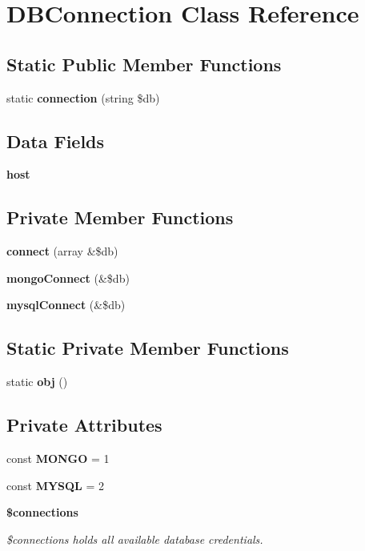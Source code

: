 \section{D\+B\+Connection Class Reference}
\label{class_d_b_connection}
\subsection*{Static Public Member Functions}
\begin{DoxyCompactItemize}
\item 
static \textbf{ connection} (string \$db)
\end{DoxyCompactItemize}
\subsection*{Data Fields}
\begin{DoxyCompactItemize}
\item 
{\bfseries host}
\end{DoxyCompactItemize}
\subsection*{Private Member Functions}
\begin{DoxyCompactItemize}
\item 
\textbf{ connect} (array \&\$db)
\item 
\textbf{ mongo\+Connect} (\&\$db)
\item 
\textbf{ mysql\+Connect} (\&\$db)
\end{DoxyCompactItemize}
\subsection*{Static Private Member Functions}
\begin{DoxyCompactItemize}
\item 
static \textbf{ obj} ()
\end{DoxyCompactItemize}
\subsection*{Private Attributes}
\begin{DoxyCompactItemize}
\item 
\mbox{\label{class_d_b_connection_a33aae4c65470265fd7be44a7605d379c}} 
const {\bfseries M\+O\+N\+GO} = 1
\item 
\mbox{\label{class_d_b_connection_ad5069a952f7f551b99564867ff5a24a9}} 
const {\bfseries M\+Y\+S\+QL} = 2
\item 
\textbf{ \$connections}
\begin{DoxyCompactList}\small\item\em \$connections holds all available database credentials. \end{DoxyCompactList}\end{DoxyCompactItemize}
